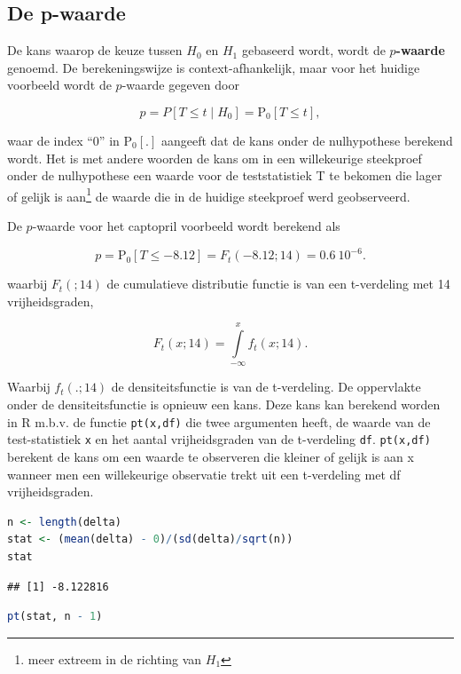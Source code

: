 \documentclass[
  12pt,dutch,coursenotes]{book}
\newcommand{\passthrough}[1]{#1}
\begin{document}
\hypertarget{de-p-waarde}{%
\subsection{De p-waarde}\label{de-p-waarde}}

De kans waarop de keuze tussen \(H_0\) en \(H_1\) gebaseerd wordt, wordt de \textbf{\(p\)-waarde} genoemd. De berekeningswijze is context-afhankelijk, maar voor het huidige voorbeeld wordt de \(p\)-waarde gegeven door

\[
    p = P\left[T \leq t \mid H_0\right] = \text{P}_0\left[T\leq t\right],
  \]

waar de index ``0'' in \(\text{P}_0\left[.\right]\) aangeeft dat de kans onder de nulhypothese berekend wordt. Het is met andere woorden de kans om in een willekeurige steekproef onder de nulhypothese een waarde voor de teststatistiek T te bekomen die lager of gelijk is aan\footnote{meer extreem in de richting van \(H_1\)} de waarde die in de huidige steekproef werd geobserveerd.

De \(p\)-waarde voor het captopril voorbeeld wordt berekend als

\[p= \text{P}_0\left[T\leq -8.12\right]=F_t(-8.12;14) = 0.6\ 10^{-6}.\]

waarbij \(F_t(;14)\) de cumulatieve distributie functie is van een t-verdeling met 14 vrijheidsgraden,

\[F_t(x;14)=\int\limits_{-\infty}^{x} f_t(x;14).\]

Waarbij \(f_t(.;14)\) de densiteitsfunctie is van de t-verdeling.
De oppervlakte onder de densiteitsfunctie is opnieuw een kans.
Deze kans kan berekend worden in R m.b.v. de functie \passthrough{\lstinline!pt(x,df)!} die twee argumenten heeft, de waarde van de test-statistiek \passthrough{\lstinline!x!} en het aantal vrijheidsgraden van de t-verdeling \passthrough{\lstinline!df!}.
\passthrough{\lstinline!pt(x,df)!} berekent de kans om een waarde te observeren die kleiner of gelijk is aan x wanneer men een willekeurige observatie trekt uit een t-verdeling met df vrijheidsgraden.

\begin{lstlisting}[language=R]
n <- length(delta)
stat <- (mean(delta) - 0)/(sd(delta)/sqrt(n))
stat
\end{lstlisting}

\begin{lstlisting}
## [1] -8.122816
\end{lstlisting}

\begin{lstlisting}[language=R]
pt(stat, n - 1)
\end{lstlisting}
\end{document}
